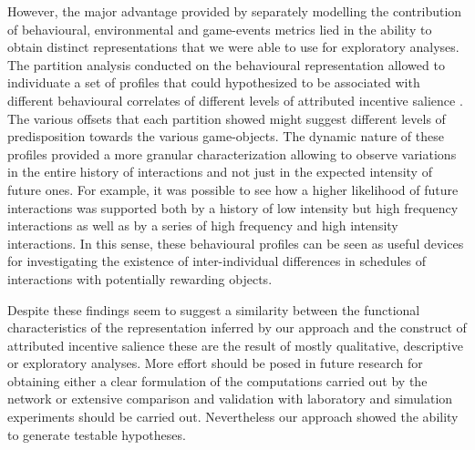 However, the major advantage provided by separately modelling the contribution of behavioural, environmental and game-events metrics lied in the ability to obtain distinct representations that we were able to use for exploratory analyses. The partition analysis conducted on the behavioural representation allowed to individuate a set of profiles that could hypothesized to be associated with different behavioural correlates of different levels of attributed incentive salience \cite{berridge2004motivation}. The various offsets that each partition showed might suggest different levels of predisposition towards the various game-objects. The dynamic nature of these profiles provided a more granular characterization allowing to observe variations in the entire history of interactions and not just in the expected intensity of future ones. For example, it was possible to see how a higher likelihood of future interactions was supported both by a history of low intensity but high frequency interactions as well as by a series of high frequency and high intensity interactions. In this sense, these behavioural profiles can be seen as useful devices for investigating the existence of inter-individual differences in schedules of interactions with potentially rewarding objects. 

Despite these findings seem to suggest a similarity between the functional characteristics of the representation inferred by our approach and the construct of attributed incentive salience these are the result of mostly qualitative, descriptive or exploratory analyses. More effort should be posed in future research for obtaining either a clear formulation of the computations carried out by the network or extensive comparison and validation with laboratory and simulation experiments should be carried out. Nevertheless our approach showed the ability to generate testable hypotheses.